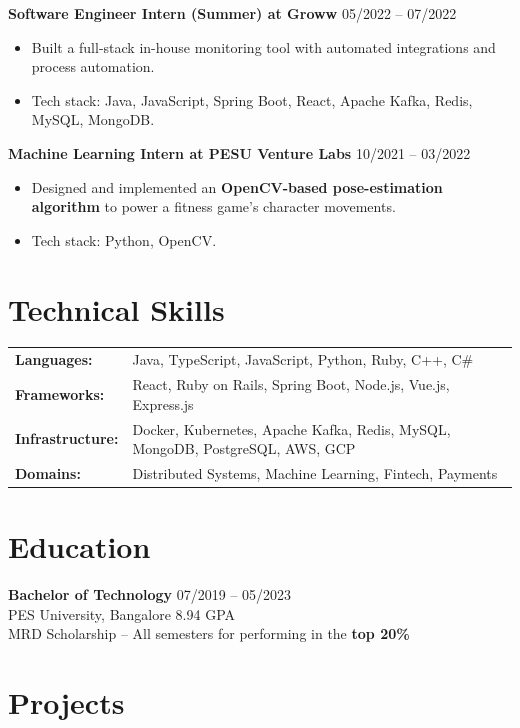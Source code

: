 \documentclass[a4paper,11pt]{article}
\begin{document}
\noindent\textbf{Software Engineer Intern (Summer) at Groww} \hfill 05/2022 -- 07/2022
\begin{itemize}[noitemsep,topsep=0pt,parsep=0pt,partopsep=0pt]
    \item Built a full-stack in-house monitoring tool with automated integrations and process automation.
    \item Tech stack: Java, JavaScript, Spring Boot, React, Apache Kafka, Redis, MySQL, MongoDB.
\end{itemize}

\noindent\textbf{Machine Learning Intern at PESU Venture Labs} \hfill 10/2021 -- 03/2022
\begin{itemize}[noitemsep,topsep=0pt,parsep=0pt,partopsep=0pt]
    \item Designed and implemented an \textbf{OpenCV-based pose-estimation algorithm} to power a fitness game's character movements.
    \item Tech stack: Python, OpenCV.
\end{itemize}

\section*{Technical Skills}
\begin{tabular}{@{} l l @{}}
\textbf{Languages:} & Java, TypeScript, JavaScript, Python, Ruby, C++, C\# \\
\textbf{Frameworks:} & React, Ruby on Rails, Spring Boot, Node.js, Vue.js, Express.js \\
\textbf{Infrastructure:} & Docker, Kubernetes, Apache Kafka, Redis, MySQL, MongoDB, PostgreSQL, AWS, GCP \\
\textbf{Domains:} & Distributed Systems, Machine Learning, Fintech, Payments \\
\end{tabular}

\section*{Education}
\noindent\textbf{Bachelor of Technology} \hfill 07/2019 -- 05/2023\\
PES University, Bangalore \hfill 8.94 GPA \\
\noindent MRD Scholarship -- All semesters for performing in the \textbf{top 20\%}

\section*{Projects}
\end{document}
